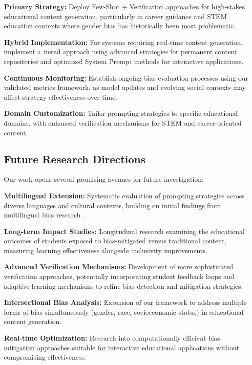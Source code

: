 \textbf{Primary Strategy:} Deploy Few-Shot + Verification approaches for high-stakes educational content generation, particularly in career guidance and STEM education contexts where gender bias has historically been most problematic.

\textbf{Hybrid Implementation:} For systems requiring real-time content generation, implement a tiered approach using advanced strategies for permanent content repositories and optimized System Prompt methods for interactive applications.

\textbf{Continuous Monitoring:} Establish ongoing bias evaluation processes using our validated metrics framework, as model updates and evolving social contexts may affect strategy effectiveness over time.

\textbf{Domain Customization:} Tailor prompting strategies to specific educational domains, with enhanced verification mechanisms for STEM and career-oriented content.

\subsection{Future Research Directions}

Our work opens several promising avenues for future investigation:

\textbf{Multilingual Extension:} Systematic evaluation of prompting strategies across diverse languages and cultural contexts, building on initial findings from multilingual bias research \cite{zhao2024multilangbias}.

\textbf{Long-term Impact Studies:} Longitudinal research examining the educational outcomes of students exposed to bias-mitigated versus traditional content, measuring learning effectiveness alongside inclusivity improvements.

\textbf{Advanced Verification Mechanisms:} Development of more sophisticated verification approaches, potentially incorporating student feedback loops and adaptive learning mechanisms to refine bias detection and mitigation strategies.

\textbf{Intersectional Bias Analysis:} Extension of our framework to address multiple forms of bias simultaneously (gender, race, socioeconomic status) in educational content generation.

\textbf{Real-time Optimization:} Research into computationally efficient bias mitigation approaches suitable for interactive educational applications without compromising effectiveness.

